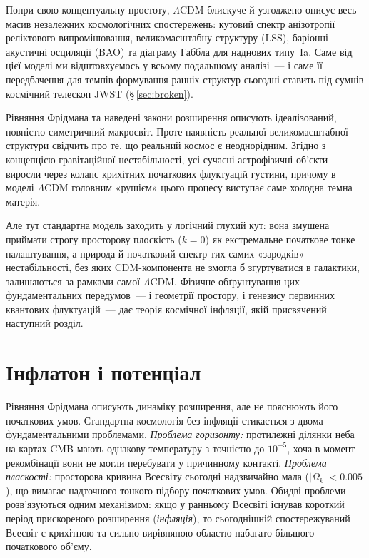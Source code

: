 \documentclass[12pt, a4paper]{article}
\begin{document}
Попри свою концептуальну простоту, $\Lambda$CDM блискуче й узгоджено
описує весь масив незалежних космологічних спостережень: кутовий спектр
анізотропії реліктового випромінювання, великомасштабну структуру (LSS),
баріонні акустичні осциляції (BAO) та діаграму Габбла для наднових типу~Ia.
Саме від цієї моделі ми відштовхуємось у всьому подальшому аналізі~--- і
саме її передбачення для темпів формування ранніх структур сьогодні
ставить під сумнів космічний телескоп JWST (§\,\ref{sec:broken}).

Рівняння Фрідмана та наведені закони розширення описують ідеалізований,
повністю симетричний макросвіт. Проте наявність реальної великомасштабної
структури свідчить про те, що реальний космос є неоднорідним. Згідно з
концепцією гравітаційної нестабільності, усі сучасні астрофізичні об'єкти
виросли через колапс крихітних початкових флуктуацій густини, причому
в моделі $\Lambda$CDM головним «рушієм» цього процесу виступає саме холодна
темна матерія.

Але тут стандартна модель заходить у логічний глухий кут: вона змушена
приймати строгу просторову плоскість ($k=0$) як екстремальне початкове
тонке налаштування, а природа й початковий спектр тих самих «зародків»
нестабільності, без яких CDM-компонента не змогла б згуртуватися в галактики,
залишаються за рамками самої $\Lambda$CDM. Фізичне обґрунтування цих
фундаментальних передумов~--- і геометрії простору, і генезису первинних
квантових флуктуацій~--- дає теорія космічної інфляції, якій присвячений
наступний розділ.


\section{Інфлатон і потенціал}
\label{sec:inflaton}

Рівняння Фрідмана описують динаміку розширення, але не пояснюють
його початкових умов. Стандартна космологія без інфляції стикається
з двома фундаментальними проблемами. \emph{Проблема горизонту:}
протилежні ділянки неба на картах CMB мають однакову температуру
з точністю до $10^{-5}$, хоча в момент рекомбінації вони не могли
перебувати у причинному контакті. \emph{Проблема пласкості:}
просторова кривина Всесвіту сьогодні надзвичайно мала
($|\Omega_k| < 0.005$), що вимагає надточного тонкого підбору
початкових умов. Обидві проблеми розв'язуються одним механізмом:
якщо у ранньому Всесвіті існував короткий період прискореного
розширення (\emph{інфляція}), то сьогоднішній спостережуваний
Всесвіт є крихітною та сильно вирівняною областю набагато більшого
початкового об'єму.
\end{document}
